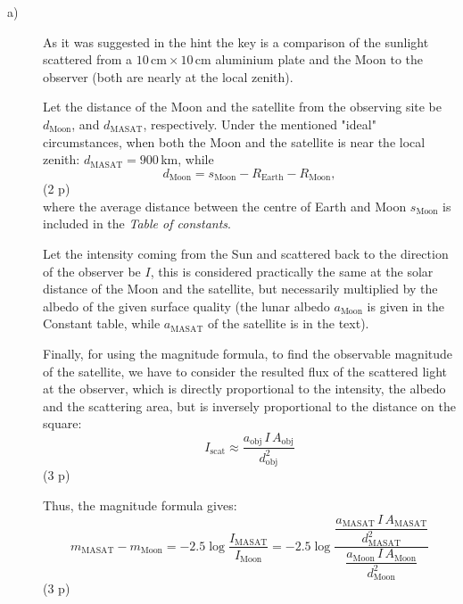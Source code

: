 \begin{description}
\item[a)] As it was suggested in the hint the key is a comparison of the
sunlight scattered from a $10\,\mathrm{cm} \times 10\,\mathrm{cm}$ aluminium
plate and the Moon to the observer (both are nearly at the local zenith).

Let the distance of the Moon and the satellite from the observing site be
$d_{\mathrm{Moon}}$, and $d_{\mathrm{MASAT}}$, respectively. Under the
mentioned "ideal" circumstances, when both the Moon and the satellite is near
the local zenith: $d_{\mathrm{MASAT}} = 900$\,km, while
\begin{equation*}
d_{\mathrm{Moon}} = s_{\mathrm{Moon}} - R_{\mathrm{Earth}}
  - R_{\mathrm{Moon}}, \tag{14.1}
\end{equation*}
\hfill(2 p)\\
where the average distance between the centre of Earth and Moon
$s_{\mathrm{Moon}}$ is included in the \emph{Table of constants}.

Let the intensity coming from the Sun and scattered back to the direction of
the observer be $I$, this is considered practically the same at the solar
distance of the Moon and the satellite, but necessarily multiplied by the
albedo of the given surface quality (the lunar albedo $a_{\mathrm{Moon}}$ is
given in the Constant table, while $a_{\mathrm{MASAT}}$ of the satellite is
in the text).

Finally, for using the magnitude formula, to find the observable magnitude of
the satellite, we have to consider the resulted flux of the scattered light
at the observer, which is directly proportional to the intensity, the albedo
and the scattering area, but is inversely proportional to the distance on the
square:
\begin{equation*}
I_{\mathrm{scat}} \approx
  \frac{a_{\mathrm{obj}}\,I\,A_{\mathrm{obj}}}{d_{\mathrm{obj}}^2}
\tag{14.2}
\end{equation*}
\hfill(3 p)

Thus, the magnitude formula gives:
\begin{equation*}
m_{\mathrm{MASAT}} - m_{\mathrm{Moon}}
  = -2.5\log\frac{I_{\mathrm{MASAT}}}{I_{\mathrm{Moon}}}
  = -2.5\log\frac{\dfrac{a_{\mathrm{MASAT}}\,I\,A_{\mathrm{MASAT}}}
      {d_{\mathrm{MASAT}}^2}}
    {\dfrac{a_{\mathrm{Moon}}\,I\,A_{\mathrm{Moon}}}{d_{\mathrm{Moon}}^2}}
\tag{14.3}
\end{equation*}
\hfill(3 p)


\end{description}
